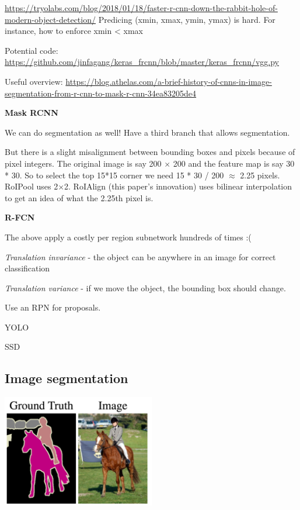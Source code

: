 \documentclass[12pt, a4paper, oneside, headinclude, footinclude]{article}
\begin{document}
\url{https://tryolabs.com/blog/2018/01/18/faster-r-cnn-down-the-rabbit-hole-of-modern-object-detection/}
Predicing (xmin, xmax, ymin, ymax) is hard. For instance, how to enforce
xmin < xmax

Potential code:
\url{https://github.com/jinfagang/keras\_frcnn/blob/master/keras\_frcnn/vgg.py}

Useful overview:
\url{https://blog.athelas.com/a-brief-history-of-cnns-in-image-segmentation-from-r-cnn-to-mask-r-cnn-34ea83205de4}

\textbf{Mask RCNN}~\cite{he2017}

We can do segmentation as well! Have a third branch that allows segmentation. 

But there is a slight misalignment between bounding boxes and pixels because
of pixel integers. The original image is say 200 $\times$ 200 and the feature map is
say 30 * 30. So to select the top 15*15 corner we need 15 * 30 / 200 $\approx$
2.25 pixels. RoIPool uses 2$\times$2. RoIAlign (this paper's innovation) uses
bilinear interpolation to get an idea of what the 2.25th pixel is.


\textbf{R-FCN}~\cite{NIPS2016_6465}

The above apply a costly per region subnetwork hundreds of times :(

\textit{Translation invariance} - the object can be anywhere in an image for
correct classification

\textit{Translation variance} - if we move the object, the bounding box should
change. 

Use an RPN for proposals.


YOLO~\cite{redmon2016yolo}

SSD~\cite{liu2016ssd}

    
\subsection{Image segmentation}

\includegraphics[width=0.5\textwidth]{Figures/segmentation-example.png}
\end{document}
